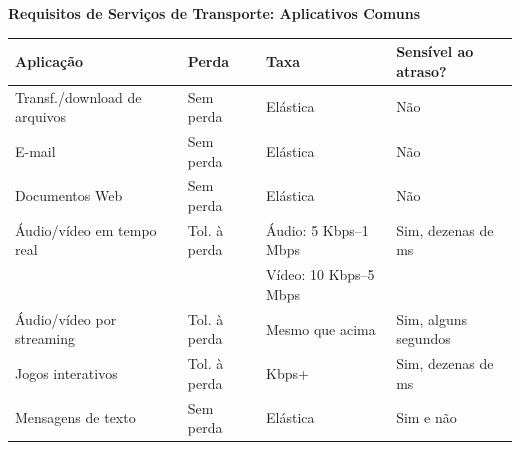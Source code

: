     \vspace{2cm}
    \textbf{Requisitos de Serviços de Transporte: Aplicativos Comuns}
    \begin{table}[ht]
        \centering
        \scriptsize
        \setlength{\tabcolsep}{3pt}

        \begin{tabular}{llll}
            \toprule
            \textbf{Aplicação} & \textbf{Perda} & \textbf{Taxa} & \textbf{Sensível ao atraso?} \\
            \midrule
            Transf./download de arquivos & Sem perda & Elástica & Não \\
            E-mail & Sem perda & Elástica & Não \\
            Documentos Web & Sem perda & Elástica & Não \\
            Áudio/vídeo em tempo real & Tol. à perda & Áudio: 5 Kbps--1 Mbps & Sim, dezenas de ms \\
            & & Vídeo: 10 Kbps--5 Mbps & \\
            Áudio/vídeo por streaming & Tol. à perda & Mesmo que acima & Sim, alguns segundos \\
            Jogos interativos & Tol. à perda & Kbps+ & Sim, dezenas de ms \\
            Mensagens de texto & Sem perda & Elástica & Sim e não \\
            \bottomrule
        \end{tabular}
    \end{table}

